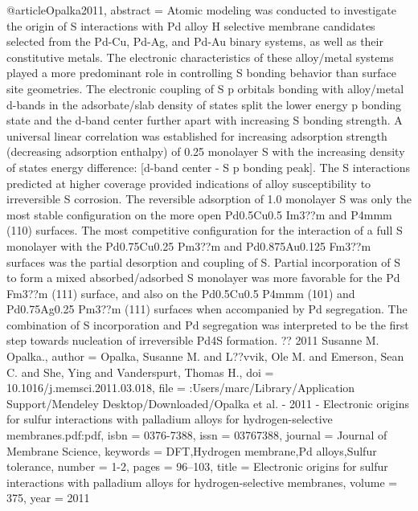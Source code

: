 @article{Opalka2011,
abstract = {Atomic modeling was conducted to investigate the origin of S interactions with Pd alloy H selective membrane candidates selected from the Pd-Cu, Pd-Ag, and Pd-Au binary systems, as well as their constitutive metals. The electronic characteristics of these alloy/metal systems played a more predominant role in controlling S bonding behavior than surface site geometries. The electronic coupling of S p orbitals bonding with alloy/metal d-bands in the adsorbate/slab density of states split the lower energy p bonding state and the d-band center further apart with increasing S bonding strength. A universal linear correlation was established for increasing adsorption strength (decreasing adsorption enthalpy) of 0.25 monolayer S with the increasing density of states energy difference: [d-band center - S p bonding peak]. The S interactions predicted at higher coverage provided indications of alloy susceptibility to irreversible S corrosion. The reversible adsorption of 1.0 monolayer S was only the most stable configuration on the more open Pd0.5Cu0.5 Im3??m and P4mmm (110) surfaces. The most competitive configuration for the interaction of a full S monolayer with the Pd0.75Cu0.25 Pm3??m and Pd0.875Au0.125 Fm3??m surfaces was the partial desorption and coupling of S. Partial incorporation of S to form a mixed absorbed/adsorbed S monolayer was more favorable for the Pd Fm3??m (111) surface, and also on the Pd0.5Cu0.5 P4mmm (101) and Pd0.75Ag0.25 Pm3??m (111) surfaces when accompanied by Pd segregation. The combination of S incorporation and Pd segregation was interpreted to be the first step towards nucleation of irreversible Pd4S formation. ?? 2011 Susanne M. Opalka.},
author = {Opalka, Susanne M. and L??vvik, Ole M. and Emerson, Sean C. and She, Ying and Vanderspurt, Thomas H.},
doi = {10.1016/j.memsci.2011.03.018},
file = {:Users/marc/Library/Application Support/Mendeley Desktop/Downloaded/Opalka et al. - 2011 - Electronic origins for sulfur interactions with palladium alloys for hydrogen-selective membranes.pdf:pdf},
isbn = {0376-7388},
issn = {03767388},
journal = {Journal of Membrane Science},
keywords = {DFT,Hydrogen membrane,Pd alloys,Sulfur tolerance},
number = {1-2},
pages = {96--103},
title = {{Electronic origins for sulfur interactions with palladium alloys for hydrogen-selective membranes}},
volume = {375},
year = {2011}
}
